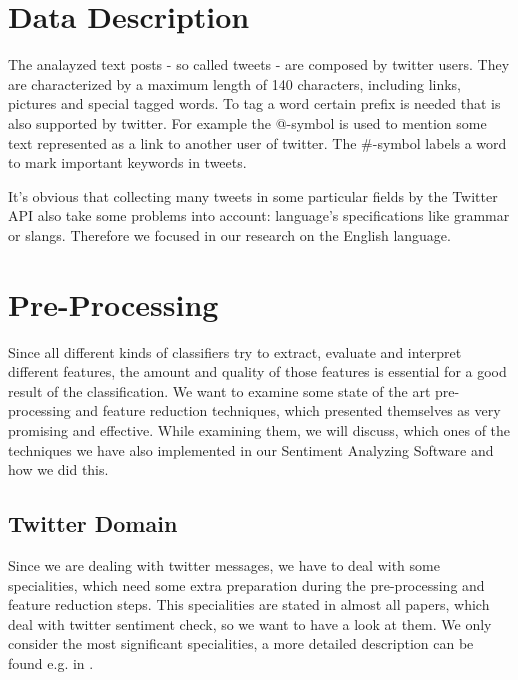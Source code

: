 \documentclass{sig-alternate}
\begin{document}
\section{Data Description}
The analayzed text posts - so called tweets - are composed by twitter users. They are characterized by a maximum length of 140 characters, including links, pictures and special tagged words. To tag a word certain prefix is needed that is also supported by twitter. For example the @-symbol is used to mention some text represented as a link to another user of twitter. The \#-symbol labels a word to mark important keywords in tweets.

It's obvious that collecting many tweets in some particular fields by the Twitter API also take some problems into account: language's specifications like grammar or slangs. Therefore we focused in our research on the English language.

\section{Pre-Processing}
Since all different kinds of classifiers try to extract, evaluate and interpret different features, the amount and quality of those features is essential for a good result of the classification. We want to examine some state of the art pre-processing and feature reduction techniques, which presented themselves as very promising and effective. While examining them, we will discuss, which ones of the techniques we have also implemented in our Sentiment Analyzing Software and how we did this.

\subsection{Twitter Domain}
Since we are dealing with twitter messages, we have to deal with some specialities, which need some extra preparation during the pre-processing and feature reduction steps. This specialities are stated in almost all papers, which deal with twitter sentiment check, so we want to have a look at them. We only consider the most significant specialities, a more detailed description can be found e.g. in \cite{Anthony2010Twitter}.
\end{document}
